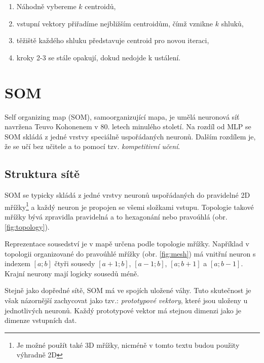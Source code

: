 \documentclass[thesis=M,czech]{FITthesis}[2012/06/26]
\begin{document}
\begin{enumerate}
\item Náhodně vybereme $k$ centroidů,
\item  vstupní vektory přiřadíme nejbližším centroidům, čímž vznikne $k$ shluků,
\item těžiště každého shluku představuje centroid pro novou iteraci,
\item kroky 2-3 se stále opakují, dokud nedojde k ustálení.
\end{enumerate}


\section{SOM}\label{sec:som_teo}
Self organizing map (SOM), samoorganizující mapa, je umělá neuronová síť navržena Teuvo Kohonenem v 80. letech minulého století. Na rozdíl od MLP se SOM skládá z jedné vrstvy speciálně uspořádaných neuronů. Dalším rozdílem je, že se učí bez učitele a to pomocí tzv. \textit{kompetitivní učení}.\cite{junkie}

\subsection{Struktura sítě}


SOM se typicky skládá z jedné vrstvy neuronů uspořádaných do pravidelné 2D mřížky\footnote{Je možné použít také 3D mřížky, nicméně v tomto textu budou použity výhradně 2D} a každý neuron je propojen se všemi složkami vstupu. Topologie takové mřížky bývá zpravidla pravidelná a to hexagonání nebo pravoúhlá (obr. \ref{fig:topology}).




Reprezentace sousedství je v mapě určena podle topologie mřížky. Například v topologii organizované do pravoúhlé mřížky (obr. \ref{fig:mesh}) má vnitřní neuron s indexem $[a;b]$ čtyři sousedy $[a+1;b]$, $[a-1;b]$, $[a;b+1]$ a $[a;b-1]$. Krajní neurony mají logicky sousedů méně.

Stejně jako dopředné sítě, SOM má ve spojích uložené váhy. Tuto skutečnost je však názornější zachycovat jako tzv.: \textit{prototypové vektory}, které jsou uloženy u jednotlivých neuronů. Každý prototypové vektor  má stejnou dimenzi jako je dimenze vstupních dat.
\end{document}

